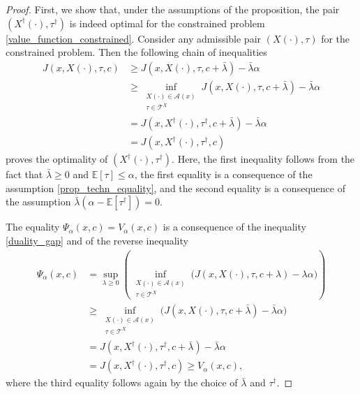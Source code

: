 \documentclass[11pt,tbtags,reqno]{article}
\theoremstyle{definition}
\numberwithin{equation}{section}
\theoremstyle{definition}
\newcommand{\ex}{\mathbb{E}}
\begin{document}
\begin{proof}
    First, we show that, under the assumptions of the proposition, the pair $(X^\dag(\cdot), \tau^\dag)$ is indeed optimal for the constrained problem \eqref{value_function_constrained}. Consider any admissible pair $(X(\cdot), \tau)$ for the constrained problem. Then the following chain of inequalities
    \begin{equation}
        \begin{split}
            J\left(x, X(\cdot), \tau, c\right)
            &\ge 
            J\left(x, X(\cdot), \tau, c + \bar{\lambda}\right) - \bar{\lambda} \alpha
            \\&\ge
            \inf\limits_{\substack{X(\cdot) \in \mathcal{A}(x) \\ \tau \in \mathcal{T}^X}} 
            J\left(x, X(\cdot), \tau, c + \bar{\lambda}\right) - \bar{\lambda} \alpha
            \\&=
            J\left(x, X^\dag(\cdot), \tau^\dag, c +\bar{\lambda}\right) - \bar{\lambda} \alpha
            \\&=
            J\left(x, X^\dag(\cdot), \tau^\dag, c\right)
        \end{split}
    \end{equation}
    proves the optimality of $(X^\dag(\cdot), \tau^\dag)$.
    Here, the first inequality follows from the fact that $\bar{\lambda} \ge 0$ and $\ex[\tau] \le \alpha$, the first equality is a consequence of the assumption \eqref{prop_techn_equality}, and the second equality is a consequence of the assumption $\bar{\lambda}(\alpha - \ex[\tau^\dag]) = 0$.

    The equality $\Psi_\alpha(x, c) = V_\alpha(x, c)$ is a consequence of the inequality \eqref{duality_gap} and of the reverse inequality
    \begin{equation}
    \begin{split}
        \Psi_\alpha(x, c) 
        &= 
        \sup_{\lambda \ge 0}
        \left(
        \inf\limits_{\substack{X(\cdot) \in \mathcal{A}(x) \\ \tau \in \mathcal{T}^X}} \Big(
            J(x, X(\cdot), \tau, c + \lambda) - \lambda \alpha 
        \Big)
        \right)
        \\&\ge
        \inf\limits_{\substack{X(\cdot) \in \mathcal{A}(x) \\ \tau \in \mathcal{T}^X}} \Big(
            J(x, X(\cdot), \tau, c + \bar{\lambda}) - \bar{\lambda} \alpha 
        \Big)
        \\&=
        J(x, X^\dag(\cdot), \tau^\dag, c + \bar{\lambda}) - \bar{\lambda} \alpha
        \\&=
        J(x, X^\dag(\cdot), \tau^\dag, c)
        \ge
        V_\alpha(x, c),
    \end{split}
    \end{equation}
    where the third equality follows again by the choice of $\bar{\lambda}$ and $\tau^\dag$.
\end{proof}
\end{document}
